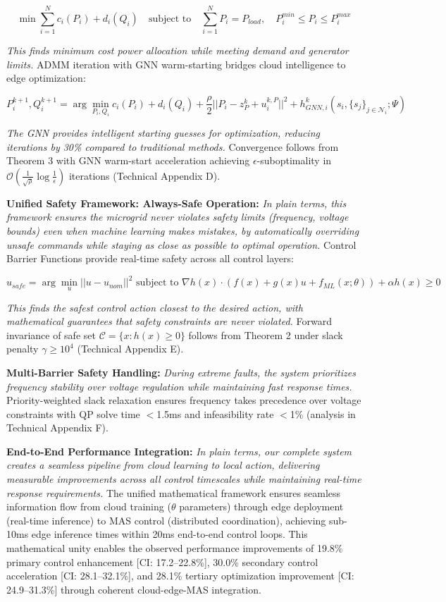 \documentclass[12pt]{article}
\begin{document}
$$\min \sum_{i=1}^N c_i(P_i) + d_i(Q_i) \quad \text{subject to} \quad \sum_{i=1}^N P_i = P_{load}, \quad P_i^{min} \leq P_i \leq P_i^{max}$$

\textit{This finds minimum cost power allocation while meeting demand and generator limits.} ADMM iteration with GNN warm-starting bridges cloud intelligence to edge optimization:

$$P_i^{k+1}, Q_i^{k+1} = \arg\min_{P_i,Q_i} c_i(P_i) + d_i(Q_i) + \frac{\rho}{2}||P_i - z_P^k + u_i^{k,P}||^2 + h_{GNN,i}^k(s_i, \{s_j\}_{j \in \mathcal{N}_i}; \Psi)$$

\textit{The GNN provides intelligent starting guesses for optimization, reducing iterations by 30\% compared to traditional methods.} Convergence follows from Theorem 3 with GNN warm-start acceleration achieving $\epsilon$-suboptimality in $\mathcal{O}(\frac{1}{\sqrt{\rho}} \log\frac{1}{\epsilon})$ iterations (Technical Appendix D).

\textbf{Unified Safety Framework: Always-Safe Operation:} \textit{In plain terms, this framework ensures the microgrid never violates safety limits (frequency, voltage bounds) even when machine learning makes mistakes, by automatically overriding unsafe commands while staying as close as possible to optimal operation.} Control Barrier Functions \cite{ames2017} provide real-time safety across all control layers:

$$u_{safe} = \arg\min_u ||u - u_{nom}||^2 \text{ subject to } \nabla h(x) \cdot (f(x) + g(x)u + f_{ML}(x; \theta)) + \alpha h(x) \geq 0$$

\textit{This finds the safest control action closest to the desired action, with mathematical guarantees that safety constraints are never violated.} Forward invariance of safe set $\mathcal{C} = \{x : h(x) \geq 0\}$ follows from Theorem 2 under slack penalty $\gamma \geq 10^4$ (Technical Appendix E).

\textbf{Multi-Barrier Safety Handling:} \textit{During extreme faults, the system prioritizes frequency stability over voltage regulation while maintaining fast response times.} Priority-weighted slack relaxation ensures frequency takes precedence over voltage constraints with QP solve time $<$1.5ms and infeasibility rate $<$1\% (analysis in Technical Appendix F).

\textbf{End-to-End Performance Integration:} \textit{In plain terms, our complete system creates a seamless pipeline from cloud learning to local action, delivering measurable improvements across all control timescales while maintaining real-time response requirements.} The unified mathematical framework ensures seamless information flow from cloud training ($\theta$ parameters) through edge deployment (real-time inference) to MAS control (distributed coordination), achieving sub-10ms edge inference times within 20ms end-to-end control loops. This mathematical unity enables the observed performance improvements of 19.8\% primary control enhancement [CI: 17.2--22.8\%], 30.0\% secondary control acceleration [CI: 28.1--32.1\%], and 28.1\% tertiary optimization improvement [CI: 24.9--31.3\%] through coherent cloud-edge-MAS integration.
\end{document}
